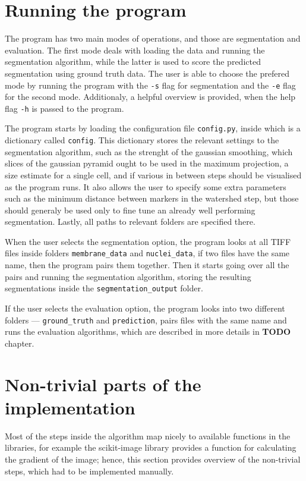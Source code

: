 \documentclass[
  digital,     %
  oneside,     %
  nosansbold,  %
  nocolorbold, %
  lof,         %
  lot,         %
]{fithesis4}
\begin{document}
\section{Running the program}

The program has two main modes of operations, and those are segmentation and
evaluation. The first mode deals with loading the data and running the
segmentation algorithm, while the latter is used to score the predicted
segmentation using ground truth data. The user is able to choose the prefered
mode by running the program with the \texttt{-s} flag for segmentation and the
\texttt{-e} flag for the second mode. Additionaly, a helpful overview is
provided, when the help flag \texttt{-h} is passed to the program.

The program starts by loading the configuration file \texttt{config.py}, inside which is a
dictionary called \texttt{config}. This dictionary stores the relevant settings to the
segmentation algorithm, such as the strenght of the gaussian smoothing, which
slices of the gaussian pyramid ought to be used in the maximum projection, a
size estimate for a single cell, and if various in between steps should be
visualised as the program runs. It also allows the user to specify some extra
parameters such as the minimum distance between markers in the watershed step,
but those should generaly be used only to fine tune an already well performing
segmentation. Lastly, all paths to relevant folders are specified there.

When the user selects the segmentation option, the program looks at all TIFF
files inside folders \texttt{membrane\_data} and \texttt{nuclei\_data}, if two files have the
same name, then the program pairs them together. Then it starts going over all
the pairs and running the segmentation algorithm, storing the resulting
segmentations inside the \texttt{segmentation\_output} folder.

If the user selects the evaluation option, the program looks into two different
folders --- \texttt{ground\_truth} and \texttt{prediction}, pairs files with the
same name and runs the evaluation algorithms, which are described in more
details in \textbf{TODO} chapter.
\section{Non-trivial parts of the implementation}
Most of the steps inside the algorithm map nicely to available functions in the
libraries, for example the scikit-image library provides a function for
calculating the gradient of the image; hence, this section provides overview of
the non-trivial steps, which had to be implemented manually.
\end{document}
